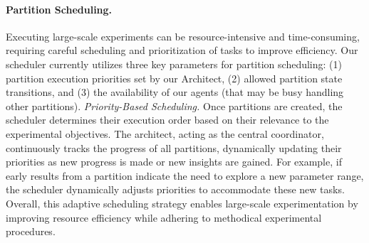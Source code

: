 

\paragraph{Partition Scheduling.} 
Executing large-scale experiments can be resource-intensive and time-consuming, requiring careful scheduling and prioritization of tasks to improve efficiency.
Our scheduler currently utilizes three key parameters for partition scheduling: (1) partition execution priorities set by our Architect, (2) allowed partition state transitions, and (3) the availability of our agents (that may be busy handling other partitions).
 \textit{Priority-Based Scheduling.} 
Once partitions are created, the scheduler determines their execution order based on their relevance to the experimental objectives. 
The architect, acting as the central coordinator, continuously tracks the progress of all partitions, dynamically updating their priorities as new progress is made or new insights are gained.  
For example, if early results from a partition indicate the need to explore a new parameter range, the scheduler dynamically adjusts priorities to accommodate these new tasks. 
\fi
Overall, this adaptive scheduling strategy enables large-scale experimentation by improving resource efficiency while adhering to methodical experimental procedures.

